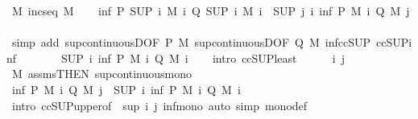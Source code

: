 \begin{isabellebody}
\ M{\isacharcolon}\ {\isachardoublequoteopen}incseq\ M{\isachardoublequoteclose}\isanewline
\ \ \isamarkupfalse%
\ {\isachardoublequoteopen}inf\ {\isacharparenleft}P\ {\isacharparenleft}SUP\ i{\isachardot}\ M\ i{\isacharparenright}{\isacharparenright}\ {\isacharparenleft}Q\ {\isacharparenleft}SUP\ i{\isachardot}\ M\ i{\isacharparenright}{\isacharparenright}\ {\isasymle}\ {\isacharparenleft}SUP\ j\ i{\isachardot}\ inf\ {\isacharparenleft}P\ {\isacharparenleft}M\ i{\isacharparenright}{\isacharparenright}\ {\isacharparenleft}Q\ {\isacharparenleft}M\ j{\isacharparenright}{\isacharparenright}{\isacharparenright}{\isachardoublequoteclose}\isanewline
\ \ \ \ \isamarkupfalse%
\ {\isacharparenleft}simp\ add{\isacharcolon}\ sup{\isacharunderscore}continuousD{\isacharbrackleft}OF\ P\ M{\isacharbrackright}\ sup{\isacharunderscore}continuousD{\isacharbrackleft}OF\ Q\ M{\isacharbrackright}\ inf{\isacharunderscore}ccSUP\ ccSUP{\isacharunderscore}inf{\isacharparenright}\isanewline
\ \ \isamarkupfalse%
\ \isamarkupfalse%
\ {\isachardoublequoteopen}{\isasymdots}\ {\isasymle}\ {\isacharparenleft}SUP\ i{\isachardot}\ inf\ {\isacharparenleft}P\ {\isacharparenleft}M\ i{\isacharparenright}{\isacharparenright}\ {\isacharparenleft}Q\ {\isacharparenleft}M\ i{\isacharparenright}{\isacharparenright}{\isacharparenright}{\isachardoublequoteclose}\isanewline
\ \ \isamarkupfalse%
\ {\isacharparenleft}intro\ ccSUP{\isacharunderscore}least{\isacharparenright}\isanewline
\ \ \ \ \isamarkupfalse%
\ i\ j\ \isamarkupfalse%
\ M\ assms{\isacharbrackleft}THEN\ sup{\isacharunderscore}continuous{\isacharunderscore}mono{\isacharbrackright}\ \isamarkupfalse%
\ {\isachardoublequoteopen}inf\ {\isacharparenleft}P\ {\isacharparenleft}M\ i{\isacharparenright}{\isacharparenright}\ {\isacharparenleft}Q\ {\isacharparenleft}M\ j{\isacharparenright}{\isacharparenright}\ {\isasymle}\ {\isacharparenleft}SUP\ i{\isachardot}\ inf\ {\isacharparenleft}P\ {\isacharparenleft}M\ i{\isacharparenright}{\isacharparenright}\ {\isacharparenleft}Q\ {\isacharparenleft}M\ i{\isacharparenright}{\isacharparenright}{\isacharparenright}{\isachardoublequoteclose}\isanewline
\ \ \ \ \ \ \isamarkupfalse%
\ {\isacharparenleft}intro\ ccSUP{\isacharunderscore}upper{}{\isacharbrackleft}of\ {\isacharunderscore}\ {\isachardoublequoteopen}sup\ i\ j{\isachardoublequoteclose}{\isacharbrackright}\ inf{\isacharunderscore}mono{\isacharparenright}\ {\isacharparenleft}auto\ simp{\isacharcolon}\ mono{\isacharunderscore}def{\isacharparenright}\isanewline

\end{isabellebody}
